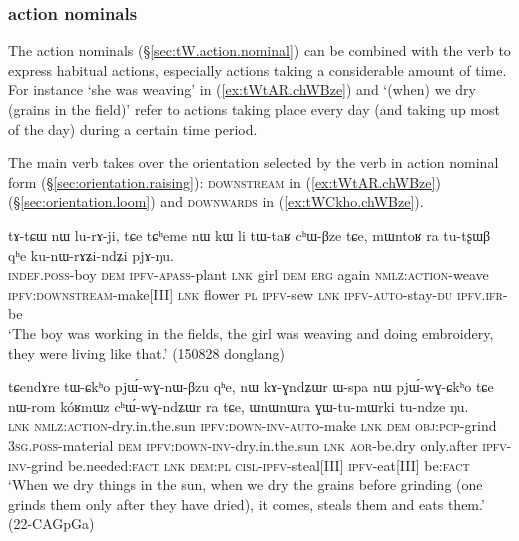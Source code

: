\subsubsection{ action nominals} \label{sec:action.nominal.Bzu}

The  action nominals (§\ref{sec:tW.action.nominal}) can be combined with the verb  to express habitual actions, especially actions taking a considerable amount of time. For instance  `she was weaving' in (\ref{ex:tWtAR.chWBze}) and  `(when) we dry (grains in the field)' refer to actions taking place every day (and taking up most of the day) during a certain time period.  

The main verb  takes over the orientation selected by the verb in action nominal form (§\ref{sec:orientation.raising}): \textsc{downstream} in (\ref{ex:tWtAR.chWBze}) (§\ref{sec:orientation.loom}) and \textsc{downwards} in (\ref{ex:tWCkho.chWBze}).

\begin{exe}
	\ex \label{ex:tWtAR.chWBze}
	\gll tɤ-tɕɯ nɯ lu-rɤ-ji,  tɕe tɕʰeme nɯ kɯ li tɯ-taʁ cʰɯ-βze tɕe, mɯntoʁ ra tu-tʂɯβ qʰe ku-nɯ-rɤʑi-ndʑi pjɤ-ŋu.  \\
	\textsc{indef}.\textsc{poss}-boy \textsc{dem} \textsc{ipfv}-\textsc{apass}-plant \textsc{lnk} girl \textsc{dem} \textsc{erg} again \textsc{nmlz}:\textsc{action}-weave \textsc{ipfv}:\textsc{downstream}-make[III] \textsc{lnk} flower \textsc{pl} \textsc{ipfv}-sew \textsc{lnk} \textsc{ipfv}-\textsc{auto}-stay-\textsc{du} \textsc{ipfv}.\textsc{ifr}-be \\
	\glt `The boy was working in the fields, the girl was weaving and doing embroidery, they were living like that.' (150828 donglang)
\end{exe}


\begin{exe}
	\ex \label{ex:tWCkho.chWBze}
	\gll tɕendɤre tɯ-ɕkʰo pjɯ́-wɣ-nɯ-βzu qʰe, nɯ kɤ-ɣndʑɯr ɯ-spa nɯ pjɯ́-wɣ-ɕkʰo tɕe nɯ-rom kóʁmɯz cʰɯ́-wɣ-ndʑɯr ra tɕe, ɯnɯnɯra ɣɯ-tu-mɯrki tu-ndze ŋu. \\
	\textsc{lnk} \textsc{nmlz}:\textsc{action}-dry.in.the.sun \textsc{ipfv}:\textsc{down}-\textsc{inv}-\textsc{auto}-make \textsc{lnk} \textsc{dem} \textsc{obj}:\textsc{pcp}-grind \textsc{3sg}.\textsc{poss}-material \textsc{dem} \textsc{ipfv}:\textsc{down}-\textsc{inv}-dry.in.the.sun \textsc{lnk} \textsc{aor}-be.dry only.after \textsc{ipfv}-\textsc{inv}-grind be.needed:\textsc{fact} \textsc{lnk} \textsc{dem}:\textsc{pl} \textsc{cisl}-\textsc{ipfv}-steal[III] \textsc{ipfv}-eat[III] be:\textsc{fact} \\
	\glt `When we dry things in the sun, when we dry the grains before grinding (one grinds them only after they have dried), it comes, steals them and eats them.' (22-CAGpGa)
\end{exe}

